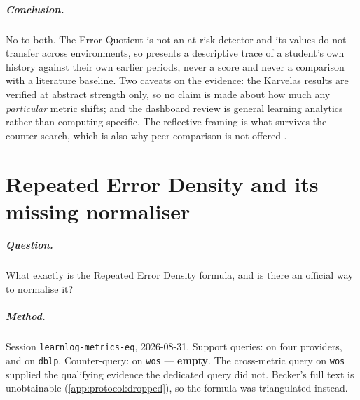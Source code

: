 \paragraph{Conclusion.}
No to both.  The Error Quotient is not an at-risk detector and its values do
not transfer across environments, so  presents a
descriptive trace of a student's own history against their own earlier
periods, never a score and never a comparison with a literature baseline.
Two caveats on the evidence: the Karvelas results are verified at abstract
strength only, so no claim is made about how much any \emph{particular}
metric shifts; and the dashboard review is general learning analytics rather
than computing-specific.  The reflective framing is what survives the
counter-search, which is also why peer comparison is not offered
\autocite{jivet2018license}.

\chapter{Repeated Error Density and its missing normaliser}
\label{app:claim:red-formula}

\paragraph{Question.}
What exactly is the Repeated Error Density formula, and is there an official
way to normalise it?

\paragraph{Method.}
Session \texttt{learnlog-metrics-eq}, 2026-08-31.  Support queries:
 on four providers, and
 on \texttt{dblp}.  Counter-query:
 on \texttt{wos} --- \textbf{empty}.  The
cross-metric query  on \texttt{wos} supplied the qualifying
evidence the dedicated query did not.  Becker's full text is unobtainable
(\cref{app:protocol:dropped}), so the formula was triangulated instead.

